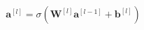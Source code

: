 \documentclass[preview]{standalone}
\begin{document}
\begin{align*}
\mathbf{a}^{[l]} = \sigma\!\left(\mathbf{W}^{[l]} \mathbf{a}^{[l-1]} + \mathbf{b}^{[l]}\right)
\end{align*}
\end{document}
